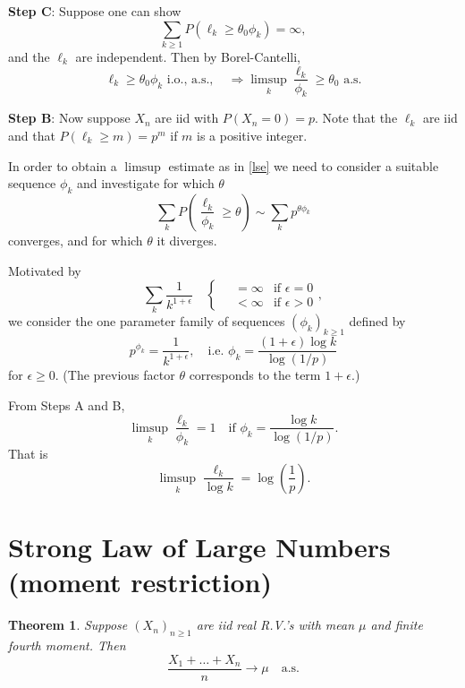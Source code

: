 \documentclass[a4paper]{amsart}
\theoremstyle{plain}
\newtheorem{theorem}{Theorem}[section]
\theoremstyle{definition}
\theoremstyle{remark}
\begin{document}
\medskip \noindent \textbf{Step C}:
Suppose one can show
\[ 
\sum_{k\geq 1} P (\ell_k \geq \theta_0  \phi_k) = \infty,
\]
and the $ \ell_k $ are independent. Then by Borel-Cantelli,
 \[
  \ell_k \geq \theta_0  \phi_k \text{ i.o., a.s.},\quad  \Longrightarrow \limsup_k \frac{\ell_k}{\phi_k} \geq \theta_0   \text{ a.s.} 
  \]


\medskip \noindent \textbf{Step B}: Now suppose $ X_n $ are iid with $ P(X_n = 0) = p $.     Note that the $ \ell_k $ are iid
and that 
$ P(\ell_k \geq m ) = p^m $ if $ m $ is a positive integer.

In order to obtain a $ \limsup $ estimate as in \eqref{lse} we need to consider a suitable sequence $ \phi_k $ and investigate 
for which $ \theta $   
\[
\sum_k P \left( \frac{\ell_k}{\phi_k} \geq \theta\right) \sim \sum_k p^{\theta \phi_k} 
\]
converges, and for which $ \theta $ it diverges. 

Motivated by 
\[
\sum_k \frac{1}{k^{1+ \epsilon }}\quad   \begin{cases}  \quad  =\infty & \text{if } \epsilon = 0 \\ \quad   <  \infty & \text{if } \epsilon > 0
                                                          \end{cases},
   \]
we consider the one parameter family of sequences $ (\phi_k)_{k\geq 1} $  defined by 
\[
p^{ \phi_k } = \frac{1}{k^{1+ \epsilon }}, \quad \text{i.e.\ } \phi_k = \frac{(1+ \epsilon ) \log k }{\log (1/p) }
\]
for $ \epsilon \geq 0 $.      (The previous factor $ \theta $ corresponds to the term $ 1 + \epsilon $.)                                               

\medskip From Steps A and B, 
\[ 
\limsup_k \frac{\ell_k}{\phi_k} = 1 \quad  \text{if }  \phi_k = \frac{  \log k }{\log (1/p) }.
\]
That is
\begin{equation} \label{} 
\limsup_k \frac{\ell_k}{\log k} = \log \left( \frac{1}{p} \right).
\end{equation} 


\section{Strong Law of Large Numbers (moment restriction)} 

\begin{theorem}   Suppose $ (X_n)_{n\geq 1} $ are iid real R.V.'s with mean $ \mu $ and finite fourth moment.  Then
\[
\frac{X_1 + \dots + X_n}{n} \to  \mu  \quad \text{a.s.}
 \]
\end{theorem} 
\end{document}
